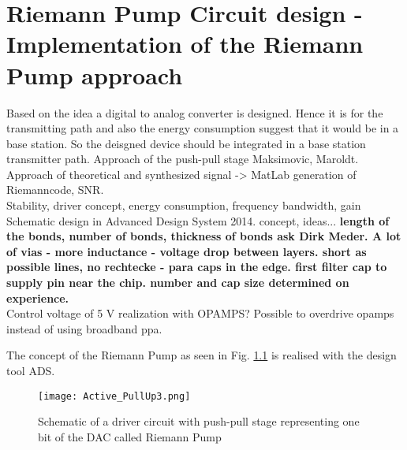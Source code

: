\chapter{Riemann Pump Circuit design - Implementation of the Riemann Pump approach}
Based on the idea a digital to analog converter is designed. Hence it is for the transmitting path and also the energy consumption suggest that it would be in a base station. So the deisgned device should be integrated in a base station transmitter path.
Approach of the push-pull stage Maksimovic, Maroldt.\\
Approach of theoretical and synthesized signal -> MatLab generation of Riemanncode, SNR.\\ Stability, driver concept, energy consumption, frequency bandwidth, gain
Schematic design in Advanced Design System 2014. concept, ideas... 
\textbf{length of the bonds, number of bonds, thickness of bonds ask Dirk Meder. A lot of vias - more inductance - voltage drop between layers. short as possible lines, no rechtecke - para caps in the edge. first filter cap to supply pin near the chip. number and cap size determined on experience. }\\
Control voltage of 5 V realization with OPAMPS? Possible to overdrive opamps instead of using broadband ppa. 


The concept of the Riemann Pump as seen in Fig. \ref{RiemannPumpConcept} is realised with the design tool ADS.

\begin{figure}[ht]
	\centering
  \texttt{[image: Active\_PullUp3.png]}
	\caption{Schematic of a driver circuit with push-pull stage representing one bit of the DAC called Riemann Pump}
	\label{RiemannPumpConcept}
\end{figure}